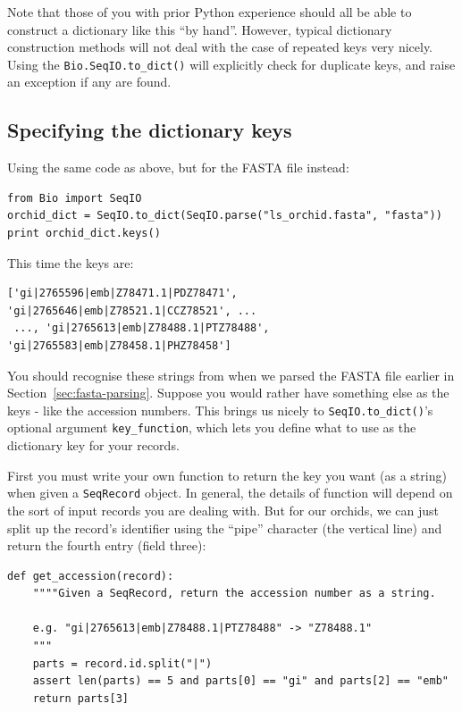 \documentclass{report}
\begin{document}
Note that those of you with prior Python experience should all be able to construct a dictionary like this ``by hand''.  However, typical dictionary construction methods will not deal with the case of repeated keys very nicely.  Using the \verb|Bio.SeqIO.to_dict()| will explicitly check for duplicate keys, and raise an exception if any are found.

\subsection{Specifying the dictionary keys}
\label{seq:seqio-todict-functionkey}

Using the same code as above, but for the FASTA file instead:

\begin{verbatim}
from Bio import SeqIO
orchid_dict = SeqIO.to_dict(SeqIO.parse("ls_orchid.fasta", "fasta"))
print orchid_dict.keys()
\end{verbatim}

\noindent This time the keys are:

\begin{verbatim}
['gi|2765596|emb|Z78471.1|PDZ78471', 'gi|2765646|emb|Z78521.1|CCZ78521', ...
 ..., 'gi|2765613|emb|Z78488.1|PTZ78488', 'gi|2765583|emb|Z78458.1|PHZ78458']
\end{verbatim}

You should recognise these strings from when we parsed the FASTA file earlier in Section~\ref{sec:fasta-parsing}.  Suppose you would rather have something else as the keys - like the accession numbers.  This brings us nicely to \verb|SeqIO.to_dict()|'s optional argument \verb|key_function|, which lets you define what to use as the dictionary key for your records.

First you must write your own function to return the key you want (as a string) when given a \verb|SeqRecord| object.  In general, the details of function will depend on the sort of input records you are dealing with.  But for our orchids, we can just split up the record's identifier using the ``pipe'' character (the vertical line) and return the fourth entry (field three):

\begin{verbatim}
def get_accession(record):
    """"Given a SeqRecord, return the accession number as a string.
  
    e.g. "gi|2765613|emb|Z78488.1|PTZ78488" -> "Z78488.1"
    """
    parts = record.id.split("|")
    assert len(parts) == 5 and parts[0] == "gi" and parts[2] == "emb"
    return parts[3]
\end{verbatim}
\end{document}
